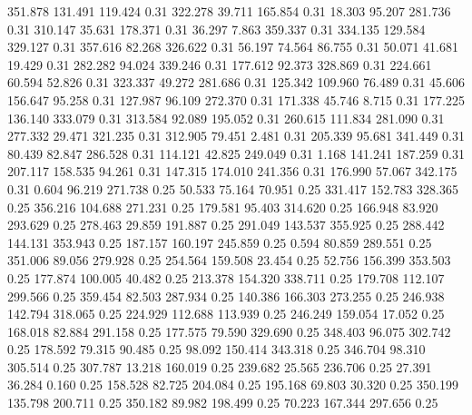  351.878  131.491  119.424         0.31
 322.278   39.711  165.854         0.31
  18.303   95.207  281.736         0.31
 310.147   35.631  178.371         0.31
  36.297    7.863  359.337         0.31
 334.135  129.584  329.127         0.31
 357.616   82.268  326.622         0.31
  56.197   74.564   86.755         0.31
  50.071   41.681   19.429         0.31
 282.282   94.024  339.246         0.31
 177.612   92.373  328.869         0.31
 224.661   60.594   52.826         0.31
 323.337   49.272  281.686         0.31
 125.342  109.960   76.489         0.31
  45.606  156.647   95.258         0.31
 127.987   96.109  272.370         0.31
 171.338   45.746    8.715         0.31
 177.225  136.140  333.079         0.31
 313.584   92.089  195.052         0.31
 260.615  111.834  281.090         0.31
 277.332   29.471  321.235         0.31
 312.905   79.451    2.481         0.31
 205.339   95.681  341.449         0.31
  80.439   82.847  286.528         0.31
 114.121   42.825  249.049         0.31
   1.168  141.241  187.259         0.31
 207.117  158.535   94.261         0.31
 147.315  174.010  241.356         0.31
 176.990   57.067  342.175         0.31
   0.604   96.219  271.738         0.25
  50.533   75.164   70.951         0.25
 331.417  152.783  328.365         0.25
 356.216  104.688  271.231         0.25
 179.581   95.403  314.620         0.25
 166.948   83.920  293.629         0.25
 278.463   29.859  191.887         0.25
 291.049  143.537  355.925         0.25
 288.442  144.131  353.943         0.25
 187.157  160.197  245.859         0.25
   0.594   80.859  289.551         0.25
 351.006   89.056  279.928         0.25
 254.564  159.508   23.454         0.25
  52.756  156.399  353.503         0.25
 177.874  100.005   40.482         0.25
 213.378  154.320  338.711         0.25
 179.708  112.107  299.566         0.25
 359.454   82.503  287.934         0.25
 140.386  166.303  273.255         0.25
 246.938  142.794  318.065         0.25
 224.929  112.688  113.939         0.25
 246.249  159.054   17.052         0.25
 168.018   82.884  291.158         0.25
 177.575   79.590  329.690         0.25
 348.403   96.075  302.742         0.25
 178.592   79.315   90.485         0.25
  98.092  150.414  343.318         0.25
 346.704   98.310  305.514         0.25
 307.787   13.218  160.019         0.25
 239.682   25.565  236.706         0.25
  27.391   36.284    0.160         0.25
 158.528   82.725  204.084         0.25
 195.168   69.803   30.320         0.25
 350.199  135.798  200.711         0.25
 350.182   89.982  198.499         0.25
  70.223  167.344  297.656         0.25
